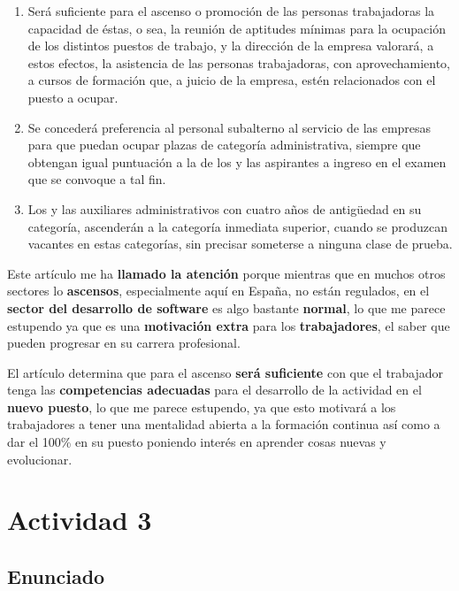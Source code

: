 \begin{enumerate}
\begin{itemize}
\begin{enumerate}
            \item Será suficiente para el ascenso o promoción de las personas trabajadoras la capacidad de éstas, o sea, la reunión de aptitudes mínimas para la ocupación de los distintos puestos de trabajo, y la dirección de la empresa valorará, a estos efectos, la asistencia de las personas trabajadoras, con aprovechamiento, a cursos de formación que, a juicio de la empresa, estén relacionados con el puesto a ocupar.

            \item Se concederá preferencia al personal subalterno al servicio de las empresas para que puedan ocupar plazas de categoría administrativa, siempre que obtengan igual puntuación a la de los y las aspirantes a ingreso en el examen que se convoque a tal fin.

            \item Los y las auxiliares administrativos con cuatro años de antigüedad en su categoría, ascenderán a la categoría inmediata superior, cuando se produzcan vacantes en estas categorías, sin precisar someterse a ninguna clase de prueba.
        \end{enumerate}
    \end{itemize}

    Este artículo me ha \textbf{llamado la atención} porque mientras que en muchos otros sectores lo \textbf{ascensos}, especialmente aquí en España, no están regulados, en el \textbf{sector del desarrollo de software} es algo bastante \textbf{normal}, lo que me parece estupendo ya que es una \textbf{motivación extra} para los \textbf{trabajadores}, el saber que pueden progresar en su carrera profesional.

    El artículo determina que para el ascenso \textbf{será suficiente} con que el trabajador tenga las \textbf{competencias adecuadas} para el desarrollo de la actividad en el \textbf{nuevo puesto}, lo que me parece estupendo, ya que esto motivará a los trabajadores a tener una mentalidad abierta a la formación continua así como a dar el 100\% en su puesto poniendo interés en aprender cosas nuevas y evolucionar.
\end{enumerate}

\section{Actividad 3}

\subsection{Enunciado}

